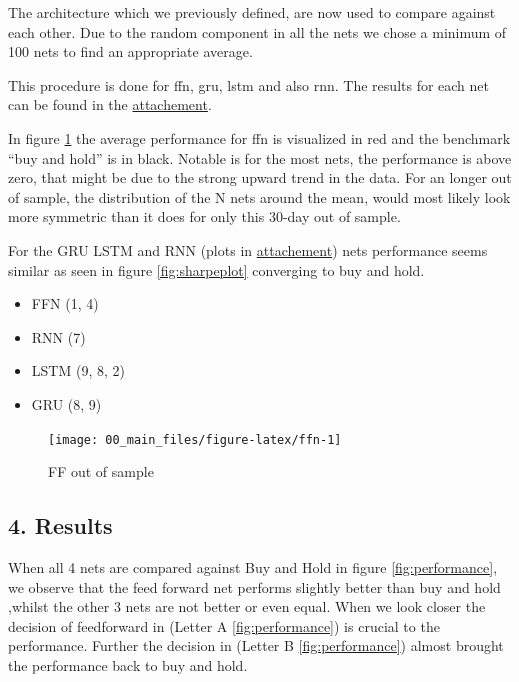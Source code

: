 \documentclass[
]{article}
\providecommand{\tightlist}{%
  \setlength{\itemsep}{0pt}\setlength{\parskip}{0pt}}
\begin{document}
\newpage

The architecture which we previously defined, are now used to compare
against each other. Due to the random component in all the nets we chose
a minimum of 100 nets to find an appropriate average.

This procedure is done for ffn, gru, lstm and also rnn. The results for
each net can be found in the
\protect\hyperlink{attachement}{attachement}.

In figure \ref{fig:ffn} the average performance for ffn is visualized in
red and the benchmark ``buy and hold'' is in black. Notable is for the
most nets, the performance is above zero, that might be due to the
strong upward trend in the data. For an longer out of sample, the
distribution of the N nets around the mean, would most likely look more
symmetric than it does for only this 30-day out of sample.

For the GRU LSTM and RNN (plots in
\protect\hyperlink{attachement}{attachement}) nets performance seems
similar as seen in figure \ref{fig:sharpeplot} converging to buy and
hold.

\begin{itemize}
\tightlist
\item
  FFN (1, 4)
\item
  RNN (7)
\item
  LSTM (9, 8, 2)
\item
  GRU (8, 9)
\end{itemize}

\begin{figure}

{\centering \texttt{[image: 00\_main\_files/figure-latex/ffn-1]} 

}

\caption{FF out of sample}\label{fig:ffn}
\end{figure}

\newpage

\hypertarget{results}{%
\subsection{4. Results}\label{results}}

When all 4 nets are compared against Buy and Hold in figure
\ref{fig:performance}, we observe that the feed forward net performs
slightly better than buy and hold ,whilst the other 3 nets are not
better or even equal. When we look closer the decision of feedforward in
(Letter A \ref{fig:performance}) is crucial to the performance. Further
the decision in (Letter B \ref{fig:performance}) almost brought the
performance back to buy and hold.
\end{document}
